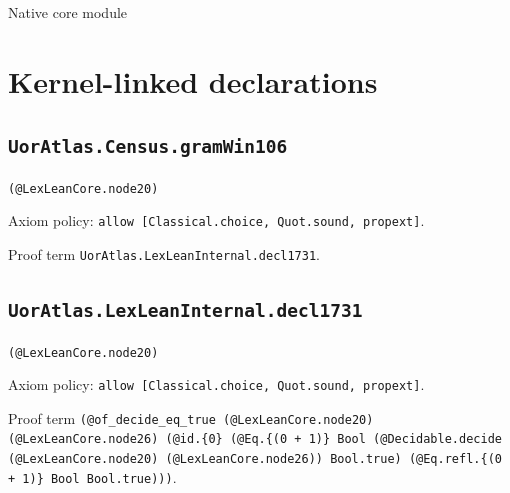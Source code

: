 \documentclass[11pt]{article}
\begin{document}
\begin{center}{\LARGE Native core module}\end{center}
\section*{Kernel-linked declarations}
\subsection*{\texttt{UorAtlas.Census.gramWin106}}
\noindent\texttt{(@LexLeanCore.node20)}\par
\noindent Axiom policy: \texttt{allow [Classical.choice, Quot.sound, propext]}.\par
\noindent Proof term \texttt{UorAtlas.LexLeanInternal.decl1731}.\par
\subsection*{\texttt{UorAtlas.LexLeanInternal.decl1731}}
\noindent\texttt{(@LexLeanCore.node20)}\par
\noindent Axiom policy: \texttt{allow [Classical.choice, Quot.sound, propext]}.\par
\noindent Proof term \texttt{(@of\_decide\_eq\_true (@LexLeanCore.node20) (@LexLeanCore.node26) (@id.\{0\} (@Eq.\{(0 + 1)\} Bool (@Decidable.decide (@LexLeanCore.node20) (@LexLeanCore.node26)) Bool.true) (@Eq.refl.\{(0 + 1)\} Bool Bool.true)))}.\par
\end{document}
